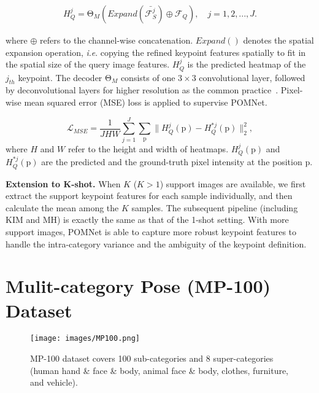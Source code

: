 \documentclass[runningheads]{llncs}
\newcommand{\ie}{\textit{i}.\textit{e}. }
\begin{document}
\begin{equation}
\begin{aligned}
    {H}_{Q}^{j} = \mathrm{\Theta}_{M}(Expand(\bar{\mathcal{F}_{S}^j}) \oplus \mathcal{F}_{Q}), \quad j = 1, 2, ..., J.
\end{aligned}
\label{eq:H_Q}
\end{equation}

\noindent where $\oplus$ refers to the channel-wise concatenation. $Expand()$ denotes the spatial expansion operation, \ie copying the refined keypoint features spatially to fit in the spatial size of the query image features. ${H}_{Q}^{j}$ is the predicted heatmap of the $j_{th}$ keypoint. The decoder  $\mathrm{\Theta}_{M}$ consists of one $3\times3$ convolutional layer, followed by deconvolutional layers for higher resolution as the common practice~\cite{xiao2018simple}. Pixel-wise mean squared error (MSE) loss is applied to supervise POMNet.

\begin{equation}
    \mathcal{L}_{MSE} = \dfrac{1}{JHW} \sum_{j=1}^J \sum_{\mathrm{p}} \lVert H_Q^j(\mathrm{p}) - H_Q^{*j}(\mathrm{p}) \rVert_2^2,
\label{eq:mse}
\end{equation}
\noindent where $H$ and $W$ refer to the height and width of heatmaps. $H_Q^j(\mathrm{p})$ and $H_Q^{*j}(\mathrm{p})$ are the predicted and the ground-truth pixel intensity at the position $\mathrm{p}$.
 
\textbf{Extension to K-shot.}
When $K$ ($K > 1$) support images are available, we first extract the support keypoint features for each sample individually, and then calculate the mean among the $K$ samples. The subsequent pipeline (including KIM and MH) is exactly the same as that of the 1-shot setting. With more support images, POMNet is able to capture more robust keypoint features to handle the intra-category variance and the ambiguity of the keypoint definition.


\section{Mulit-category Pose (MP-100) Dataset}

\begin{figure}[t]
	\centering
	\texttt{[image: images/MP100.png]}
	\caption{MP-100 dataset covers 100 sub-categories and 8 super-categories (human hand \& face \& body, animal face \& body, clothes, furniture, and vehicle).
	}
	\label{fig:MP}
\end{figure}
\end{document}

